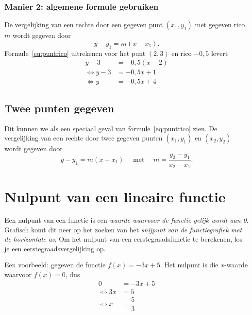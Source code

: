 \subsubsection{Manier 2: algemene formule gebruiken}
De vergelijking van een rechte door een gegeven punt $(x_1,y_1)$ met gegeven rico $m$ wordt gegeven door
\begin{equation}\label{eq:puntrico}
y-y_1=m(x-x_1).
\end{equation}
Formule~\eqref{eq:puntrico} uitrekenen voor het punt $(2,3)$ en rico $-0,5$ levert
\begin{align*}
y-3&=-0,5(x-2)\\
\Leftrightarrow y-3&=-0,5x + 1\\
\Leftrightarrow y&=-0,5x+4
\end{align*}

\subsection{Twee punten gegeven}
Dit kunnen we als een speciaal geval van formule~\eqref{eq:puntrico} zien. De vergelijking van een rechte door twee gegeven punten $(x_1,y_1)$ en $(x_2,y_2)$ wordt gegeven door
\begin{equation}\label{eq:puntpunt}
y-y_1=m(x-x_1) \quad \text{ met } \quad m=\dfrac{y_2-y_1}{x_2-x_1}.
\end{equation}

\section{Nulpunt van een lineaire functie}
Een nulpunt van een functie is een \emph{waarde waarvoor de functie gelijk wordt aan 0}. Grafisch komt dit neer op het zoeken van het \emph{snijpunt van de functiegrafiek met de horizontale as}. Om het nulpunt van een eerstegraadsfunctie te berekenen, los je een eerstegraadsvergelijking op.

Een voorbeeld: gegeven de functie $f(x)=-3x+5$. Het nulpunt is die $x$-waarde waarvoor $f(x)=0$, dus
\begin{align*}
0&=-3x+5\\
\Leftrightarrow 3x&=5\\
\Leftrightarrow x&=\dfrac{5}{3}
\end{align*}


